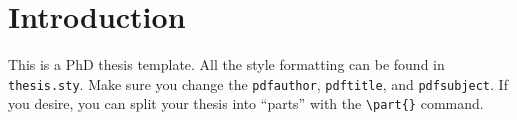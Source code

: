 


%
%

\chapter{Introduction} \label{chap_intro}

This is a PhD thesis template.
All the style formatting can be found in \texttt{thesis.sty}.
Make sure you change the \texttt{pdfauthor}, \texttt{pdftitle}, and \texttt{pdfsubject}.
If you desire, you can split your thesis into ``parts'' with the \verb+\part{}+ command.



